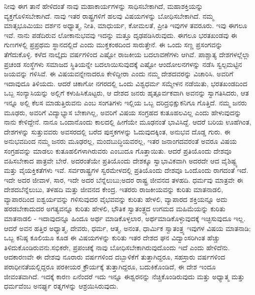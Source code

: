 ನೀವು ಈಗ ತಾನೆ ಹೇಳಿದಂತೆ ನಾವು ಮಹಾಕಾರ್ಯಗಳನ್ನು ಸಾಧಿಸಬೇಕಾಗಿದೆ, ಮಹಾಶಕ್ತಿಯನ್ನು ವ್ಯಕ್ತಗೊಳಿಸಬೇಕಾಗಿದೆ. ನಾವು ಇತರ ರಾಷ್ಟ್ರಗಳಿಗೆ ಹಲವು ವಿಷಯಗಳನ್ನು ಬೋಧಿಸಬೇಕಾಗಿದೆ. ನಮ್ಮ ಮಾತೃಭೂಮಿಯು ದರ್ಶನ ಅಧ್ಯಾತ್ಮ, ನೀತಿ, ಮಾಧುರ್ಯ, ಕೋಮಲತೆ, ಪ್ರೀತಿ ಇವುಗಳ ತವರೂರು. ಇವು ಈಗಲೂ ಇವೆ. ನಾನು ಪಡೆದಿರುವ ಲೋಕಾನುಭವವು ಇದನ್ನು ಮತ್ತೂ ದೃಢಪಡಿಸಿರುವುದು. ಈಗಲೂ ಭರತಖಂಡವು ಈ ಗುಣಗಳಲ್ಲಿ ಪ್ರಪ್ರಥಮ ಸ್ಥಾನದಲ್ಲಿದೆ ಎಂದು ಮುಕ್ತಕಂಠದಿಂದ ಸಾರುತ್ತೇನೆ. ಈ ಒಂದು ಸಣ್ಣ ಪ್ರಸಂಗವನ್ನು ತೆಗೆದುಕೊಳ್ಳಿ. ಕಳೆದ ನಾಲ್ಕೈದು ವರ್ಷಗಳಿಂದ ಎಷ್ಟೋ ರಾಜಕೀಯ ಬದಲಾವಣೆಗಳು ಆಗಿವೆ. ಪಾಶ್ಚಾತ್ಯ ದೇಶಗಳಲ್ಲೆಲ್ಲಾ ಪ್ರಚಂಡ ಸಂಸ್ಥೆಗಳು ಸಮಾಜದ ಸ್ಥಿತಿಯನ್ನೇ ಬದಲಾಯಿಸುವುದಕ್ಕೆ ಎಷ್ಟೋ ಆಂದೋಲನಗಳನ್ನು ನಡೆಸಿ ಸ್ವಲ್ಪಮಟ್ಟಿನ ಜಯವನ್ನು ಗಳಿಸಿವೆ. ಈ ವಿಷಯವನ್ನೇನಾದರೂ ಕೇಳಿದ್ದೀರಾ ಎಂದು ನಮ್ಮ ದೇಶದವರನ್ನು ವಿಚಾರಿಸಿ. ಅವರಿಗೆ ಇದಾವುದೂ ತಿಳಿಯದು. ಆದರೆ ಚಿಕಾಗೋ ನಗರದಲ್ಲಿ ಒಂದು ವಿಶ್ವಧರ್ಮ ಸಮ್ಮೇಳನ ನಡೆಯಿತು, ಭರತಖಂಡದಿಂದ ಒಬ್ಬ ಸಂನ್ಯಾಸಿಯನ್ನು ಅಲ್ಲಿಗೆ ಕಳುಹಿಸಿಕೊಟ್ಟರು, ಆ ದೇಶದ ಜನರು ಹೃತ್ಪೂರ್ವಕವಾಗಿ ಅವನನ್ನು ಸ್ವಾಗತಿಸಿದರು, ಆತ ಇನ್ನೂ ಅಲ್ಲಿ ಕೆಲಸ ಮಾಡುತ್ತಿರುವನು ಎಂಬ ಸಂಗತಿಗಳು ಇಲ್ಲಿಯ ಒಬ್ಬ ದರಿದ್ರ\break ಭಿಕ್ಷುಕನಿಗೂ ಗೊತ್ತಿದೆ. ನಮ್ಮ ಜನರು ಮೂಢರು, ಅವರಿಗೆ ವಿದ್ಯಾಭ್ಯಾಸ ಬೇಕಾಗಿಲ್ಲ, ಅವರಿಗೆ ವಿಷಯ ಸಂಗ್ರಹದ ಕುತೂಹಲವಿಲ್ಲ ಎಂದು ಹೇಳುವುದನ್ನು ನಾನು ಕೇಳಿದ್ದೇನೆ. ನಾನೂ ಒಂದಾನೊಂದು ಕಾಲದಲ್ಲಿ ಹೀಗೆಯೇ ಮೂಢನಂತೆ ಭಾವಿಸಿದ್ದೆ. ಆದರೆ ಬರಿಯ ಊಹೆಗಿಂತ, ದೇಶಗಳನ್ನು ಸುತ್ತುವವರು ಅವಸರದಲ್ಲಿ ಬರೆದ ಪುಸ್ತಕಗಳನ್ನು ಓದುವುದಕ್ಕಿಂತ, ಅನುಭವ ದೊಡ್ಡ ಗುರು. ಈ ಅನುಭವದಿಂದ ನಮ್ಮ ಜನರು ಮೂಢರಲ್ಲ, ಮಂದಬುದ್ಧಿಯವರಲ್ಲ, ಇತರ ಜನಾಂಗದವರಂತೆ ಅವರೂ ವಿಷಯ ಸಂಗ್ರಹವನ್ನು ಮಾಡಲು ಕುತೂಹಲಿಗಳಾಗಿರುವರು ಎಂಬುದೂ ಗೊತ್ತಾಯಿತು. ಆದರೆ ಪ್ರತಿಯೊಂದು ದೇಶವೂ ವಹಿಸಬೇಕಾದ ಪಾತ್ರವೇ ಬೇರೆ. ಅದರಂತೆಯೇ ಪ್ರತಿಯೊಂದು ದೇಶಕ್ಕೂ ಸ್ವಾಭಾವಿಕವಾಗಿ ಅದರದೇ ಆದ ವೈಶಿಷ್ಟ್ಯ ಮತ್ತು ವೈಯಕ್ತಿಕತೆಗಳು ಇವೆ. ಸರ್ವರಾಷ್ಟ್ರಗಳ ಸ್ವರಮೇಳದಲ್ಲಿ ಪ್ರತಿಯೊಂದು ದೇಶವೂ ಒಂದೊಂದು ರಾಗದಂತೆ ಇದೆ. ಇದೇ ಅದರ ಜೀವಾಳ, ಸಾರ, ಇದೇ ಅದರ ಬೆನ್ನೆಲುಬು;\break ಅದರ ರಾಷ್ಟ್ರ ಜೀವನದ ತಳಹದಿ. ಧರ್ಮವು ಮಾತ್ರವೇ ಈ ದೇಶದ\break ಬೆನ್ನೆಲುಬು, ತಳಹದಿ ಮತ್ತು ಜೀವನದ ಕೇಂದ್ರ. ಇತರರು ರಾಜಕೀಯವನ್ನು ಕುರಿತು ಮಾತನಾಡಲಿ, ವ್ಯಾಪಾರದಿಂದ ಐಶ್ವರ್ಯವನ್ನು ಗಳಿಸುವುದರ ವೈಭವವನ್ನು ಕುರಿತು ಹೇಳಲಿ, ವ್ಯಾಪಾರದ ಶಕ್ತಿಯನ್ನೂ ಅದು ಹರಡಬೇಕಾದುದರ ಅಗತ್ಯವನ್ನೂ ಕುರಿತು ಹೇಳಲಿ, ಭೌತಿಕ ಸ್ವಾತಂತ್ರ್ಯದ ಉಗಮದ ಮಹಿಮೆಯನ್ನು ಕುರಿತು ಮಾತನಾಡಲಿ - ಇದಾವುದನ್ನೂ ಹಿಂದೂ ಅರ್ಥ ಮಾಡಿಕೊಳ್ಳಲಾರ, ಅರ್ಥಮಾಡಿಕೊಳ್ಳುವುದಕ್ಕೆ ಇಚ್ಛಿಸುವುದೂ ಇಲ್ಲ. ಆದರೆ ಅವನ ಹತ್ತಿರ ಅಧ್ಯಾತ್ಮ, ದೇವರು, ಧರ್ಮ, ಆತ್ಮ, ಅನಂತ, ಧಾರ್ಮಿಕ ಸ್ವಾತಂತ್ರ್ಯ ಇವುಗಳ ವಿಷಯ ಮಾತನಾಡಿ; ಒಬ್ಬ ಕನಿಷ್ಠ ಕೂಲಿಯೂ ಕೂಡ ಈ ವಿಷಯಗಳನ್ನು ಕುರಿತು ಇತರ ದೇಶದ ಘನ ವಿದ್ವಾಂಸರಿಗಿಂತ ಹೆಚ್ಚು ತಿಳಿದುಕೊಂಡಿರುವನು.\break ಸಭಿಕರೇ, ಪ್ರಪಂಚಕ್ಕೆ ನಾವು ಬೋಧಿಸಬೇಕಾಗಿರುವುದೊಂದು ಇದೆ ಎಂದು ಹೇಳಿದೆನು. ಆದಕಾರಣವೇ ಈ ದೇಶವು ನೂರಾರು ವರ್ಷಗಳಿಂದ ದಬ್ಬಾಳಿಕೆಗೆ ತುತ್ತಾಗಿದ್ದರೂ, ಸಹಸ್ರಾರು ವರ್ಷಗಳಿಂದ ಪರಾಧೀನತೆಯಲ್ಲಿದ್ದರೂ ಪರಕೀಯರ ಕ್ರೌರ್ಯಕ್ಕೆ ತುತ್ತಾಗಿದ್ದರೂ, ಬದುಕಿಕೊಂಡಿದೆ, ಈ ದೇಶ ಇಂದೂ ಜೀವಂತವಾಗಿದೆ. ಇದಕ್ಕೆ ಕಾರಣ ಏನೆಂದರೆ ಇದು ಇನ್ನೂ ಈಶ್ವರನನ್ನು ನೆಚ್ಚಿಕೊಂಡಿರುವುದು ಮತ್ತು ಅಧ್ಯಾತ್ಮ ಮತ್ತು ಧರ್ಮವೆಂಬ ಅನರ್ಘ್ಯ ರತ್ನಗಳನ್ನು ಆಶ್ರಯಿಸಿರುವುದು.

